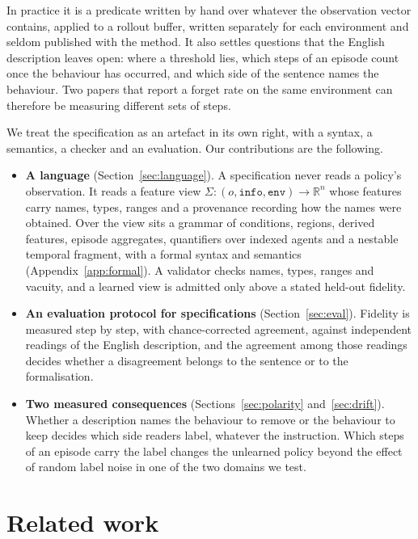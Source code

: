 \documentclass{article}
\begin{document}
In practice it is a predicate written by hand over whatever the
observation vector contains, applied to a rollout buffer, written
separately for each environment and seldom published with the method. It
also settles questions that the English description leaves open: where a
threshold lies, which steps of an episode count once the behaviour has
occurred, and which side of the sentence names the behaviour. Two papers
that report a forget rate on the same environment can therefore be
measuring different sets of steps.

We treat the specification as an artefact in its own right, with a
syntax, a semantics, a checker and an evaluation. Our contributions are
the following.

\begin{itemize}
\item \textbf{A language} (Section~\ref{sec:language}). A specification
never reads a policy's observation. It reads a feature view
$\Sigma:(o,\texttt{info},\texttt{env})\rightarrow\mathbb{R}^{n}$ whose
features carry names, types, ranges and a provenance recording how the
names were obtained. Over the view sits a grammar of conditions, regions,
derived features, episode aggregates, quantifiers over indexed agents and
a nestable temporal fragment, with a formal syntax and semantics
(Appendix~\ref{app:formal}). A validator checks names, types, ranges and
vacuity, and a learned view is admitted only above a stated held-out
fidelity.

\item \textbf{An evaluation protocol for specifications}
(Section~\ref{sec:eval}). Fidelity is measured step by step, with
chance-corrected agreement, against independent readings of the English
description, and the agreement among those readings decides whether a
disagreement belongs to the sentence or to the formalisation.

\item \textbf{Two measured consequences} (Sections~\ref{sec:polarity}
and~\ref{sec:drift}). Whether a description names the behaviour to remove
or the behaviour to keep decides which side readers label, whatever the
instruction. Which steps of an episode carry the label changes the
unlearned policy beyond the effect of random label noise in one of the two
domains we test.
\end{itemize}

\section{Related work}
\label{sec:related}
\end{document}
